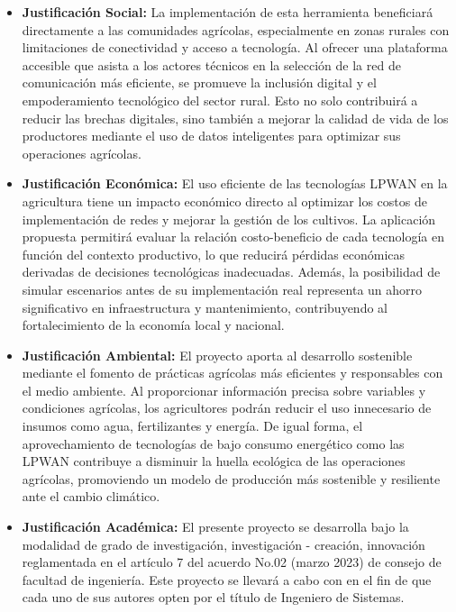 \begin{itemize}
      \item \textbf{Justificación Social:} La implementación de esta herramienta
            beneficiará directamente a las comunidades agrícolas, especialmente en
            zonas rurales con limitaciones de conectividad y acceso a  tecnología.
            Al ofrecer una plataforma accesible que asista a los actores  técnicos
            en la selección de la red de comunicación más eficiente,  se  promueve
            la inclusión digital y el empoderamiento tecnológico del sector rural.
            Esto no solo contribuirá a reducir las brechas digitales, sino también
            a mejorar la calidad de vida de los productores  mediante  el  uso  de
            datos inteligentes para optimizar sus operaciones agrícolas.
      \item \textbf{Justificación Económica:} El uso eficiente de las tecnologías
            LPWAN  en  la  agricultura  tiene  un  impacto  económico  directo  al
            optimizar los costos de implementación de redes y mejorar  la  gestión
            de los cultivos. La aplicación propuesta permitirá evaluar la relación
            costo-beneficio de cada tecnología en función del contexto productivo,
            lo  que  reducirá  pérdidas   económicas   derivadas   de   decisiones
            tecnológicas inadecuadas. Además, la posibilidad de simular escenarios
            antes de su implementación real representa un ahorro significativo  en
            infraestructura y mantenimiento, contribuyendo al  fortalecimiento  de
            la economía local y nacional.
      \item \textbf{Justificación Ambiental:} El proyecto aporta al desarrollo
            sostenible mediante el fomento de prácticas agrícolas más eficientes y
            responsables  con  el  medio  ambiente.  Al  proporcionar  información
            precisa sobre variables  y  condiciones  agrícolas,  los  agricultores
            podrán reducir el uso innecesario de insumos como agua,  fertilizantes
            y energía. De igual forma, el aprovechamiento de tecnologías  de  bajo
            consumo energético como las LPWAN  contribuye  a  disminuir  la
            huella ecológica de las operaciones agrícolas, promoviendo  un  modelo
            de producción más sostenible y resiliente ante el cambio climático.
      \item \textbf{Justificación Académica:} El presente proyecto  se  desarrolla
            bajo la modalidad de grado de investigación, investigación - creación, innovación
            reglamentada en el artículo 7 del acuerdo No.02 (marzo 2023) de consejo de facultad de
            ingeniería. Este proyecto se llevará a cabo con en el fin de  que  cada  uno  de  sus
            autores opten por el título de Ingeniero de Sistemas.
\end{itemize}
